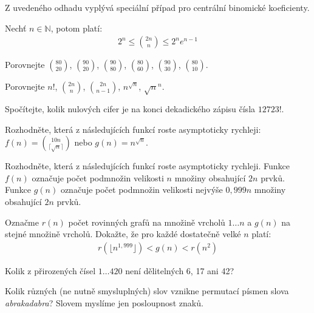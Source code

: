 Z uvedeného odhadu vyplývá speciální případ pro centrální binomické koeficienty.
\begin{t_corollary}
  Nechť $n\in\mathbb{N}$, potom platí:
  \begin{align*}
    2^n\leq \binom{2n}{n}\leq 2^ne^{n-1}
  \end{align*}
\end{t_corollary}

\begin{t_exercise}
  \item Porovnejte $\binom{80}{20}$, $\binom{90}{20}$, $\binom{90}{80}$, $\binom{80}{60}$, $\binom{90}{30}$, $\binom{80}{10}$.
  \item Porovnejte $n!$, $\binom{2n}{n}$, $\binom{2n}{n-1}$, $n^{\sqrt{n}}$, $\sqrt{n}^n$.
  \item Spočítejte, kolik nulových cifer je na konci dekadického zápisu čísla $12723!$.
  \item Rozhodněte, která z následujících funkcí roste asymptoticky rychleji:
  \\$f(n)=\binom{10n}{\lceil\sqrt{n}\rceil}$ nebo $g(n)=n^\sqrt{n}$.
  \item Rozhodněte, která z následujících funkcí roste asymptoticky rychleji. Funkce $f(n)$ označuje počet podmnožin velikosti $n$ množiny obsahující $2n$ prvků. Funkce $g(n)$ označuje počet podmnožin velikosti nejvýše $0,999n$ množiny obsahující $2n$ prvků.
  \item Označme $r(n)$ počet rovinných grafů na množině vrcholů $1\dots n$ a $g(n)$ na stejné množině vrcholů. Dokažte, že pro každé dostatečně velké $n$ platí:
  \begin{align*}
    r(\lfloor n^{1,999} \rfloor)<g(n)<r(n^2)
  \end{align*}
  \item Kolik z přirozených čísel $1\dots 420$ není dělitelných 6, 17 ani 42?
  \item Kolik různých (ne nutně smysluplných) slov vznikne permutací písmen slova \textit{abrakadabra}? Slovem myslíme jen posloupnost znaků.
\end{t_exercise}